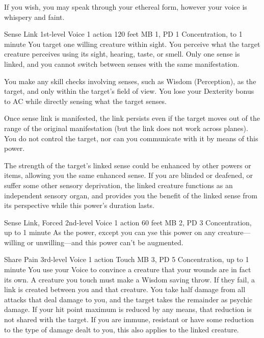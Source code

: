 If you wish,
you may speak through your ethereal form,
however your voice is whispery and faint.

\DndPowerHeader%
  {Sense Link}
  {1st-level Voice}
  {1 action}
  {120 feet}
  {MB 1, PD 1}
  {Concentration, to 1 minute}
  You target one willing creature within sight.
  You perceive what the target creature perceives using its sight,
  hearing, taste, or smell.
  Only one sense is linked,
  and you cannot switch between senses with the same manifestation.

  You make any skill checks involving senses,
  such as Wisdom (Perception), as the target,
  and only within the target's field of view.
  You lose your Dexterity bonus to AC while
  directly sensing what the target senses.
  
  Once sense link is manifested, the link persists
  even if the target moves out of the range
  of the original manifestation
  (but the link does not work across planes).
  You do not control the target,
  nor can you communicate with it by means of this power.
  
  The strength of the target's linked sense could be enhanced
  by other powers or items,
  allowing you the same enhanced sense.
  If you are blinded or deafened, or suffer some other sensory deprivation,
  the linked creature functions as an independent sensory organ,
  and provides you the benefit of the linked sense from its perspective
  while this power's duration lasts.

\DndPowerHeader%
  {Sense Link, Forced}
  {2nd-level Voice}
  {1 action}
  {60 feet}
  {MB 2, PD 3}
  {Concentration, up to 1 minute}
As the  power,
except you can yse this power on any creature---willing or
unwilling---and this power can't be augmented.

\DndPowerHeader%
  {Share Pain}
  {3rd-level Voice}
  {1 action}
  {Touch}
  {MB 3, PD 5}
  {Concentration, up to 1 minute}
  You use your Voice to convince a creature that your wounds are
  in fact its own.
  A creature you touch must make a Wisdom saving throw.
  If they fail, a link is created between you and that creature.
  You take half damage from all attacks that deal damage to you,
  and the target takes the remainder as psychic damage.
  If your hit point maximum is reduced by any means,
  that reduction is not shared with the target.
  If you are immune, resistant or have some reduction
  to the type of damage dealt to you,
  this also applies to the linked creature. 
  
